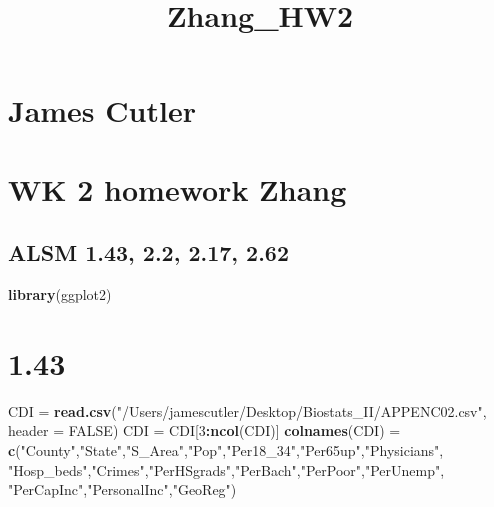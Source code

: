 \documentclass[]{article}
\title{Zhang\_HW2}
\author{}
\date{}
\newenvironment{Shaded}{\begin{snugshade}}{\end{snugshade}}
\newcommand{\DataTypeTok}[1]{\textcolor[rgb]{0.13,0.29,0.53}{#1}}
\newcommand{\DecValTok}[1]{\textcolor[rgb]{0.00,0.00,0.81}{#1}}
\newcommand{\KeywordTok}[1]{\textcolor[rgb]{0.13,0.29,0.53}{\textbf{#1}}}
\newcommand{\NormalTok}[1]{#1}
\newcommand{\OperatorTok}[1]{\textcolor[rgb]{0.81,0.36,0.00}{\textbf{#1}}}
\newcommand{\OtherTok}[1]{\textcolor[rgb]{0.56,0.35,0.01}{#1}}
\newcommand{\StringTok}[1]{\textcolor[rgb]{0.31,0.60,0.02}{#1}}
\begin{document}
\maketitle

\hypertarget{james-cutler}{%
\section{James Cutler}\label{james-cutler}}

\hypertarget{wk-2-homework-zhang}{%
\section{WK 2 homework Zhang}\label{wk-2-homework-zhang}}

\hypertarget{alsm-1.43-2.2-2.17-2.62}{%
\subsection{ALSM 1.43, 2.2, 2.17, 2.62}\label{alsm-1.43-2.2-2.17-2.62}}

\begin{Shaded}
\begin{Highlighting}[]
\KeywordTok{library}\NormalTok{(ggplot2)}
\end{Highlighting}
\end{Shaded}

\hypertarget{section}{%
\section{1.43}\label{section}}

\begin{Shaded}
\begin{Highlighting}[]
\NormalTok{CDI =}\StringTok{ }\KeywordTok{read.csv}\NormalTok{(}\StringTok{"/Users/jamescutler/Desktop/Biostats_II/APPENC02.csv"}\NormalTok{, }
               \DataTypeTok{header =} \OtherTok{FALSE}\NormalTok{)}
\NormalTok{CDI =}\StringTok{ }\NormalTok{CDI[}\DecValTok{3}\OperatorTok{:}\KeywordTok{ncol}\NormalTok{(CDI)]}
\KeywordTok{colnames}\NormalTok{(CDI) =}\StringTok{ }\KeywordTok{c}\NormalTok{(}\StringTok{"County"}\NormalTok{,}\StringTok{"State"}\NormalTok{,}\StringTok{"S_Area"}\NormalTok{,}\StringTok{"Pop"}\NormalTok{,}\StringTok{"Per18_34"}\NormalTok{,}\StringTok{"Per65up"}\NormalTok{,}\StringTok{"Physicians"}\NormalTok{,}
                  \StringTok{"Hosp_beds"}\NormalTok{,}\StringTok{"Crimes"}\NormalTok{,}\StringTok{"PerHSgrads"}\NormalTok{,}\StringTok{"PerBach"}\NormalTok{,}\StringTok{"PerPoor"}\NormalTok{,}\StringTok{"PerUnemp"}\NormalTok{,}
                  \StringTok{"PerCapInc"}\NormalTok{,}\StringTok{"PersonalInc"}\NormalTok{,}\StringTok{"GeoReg"}\NormalTok{)}
\end{Highlighting}
\end{Shaded}
\end{document}
